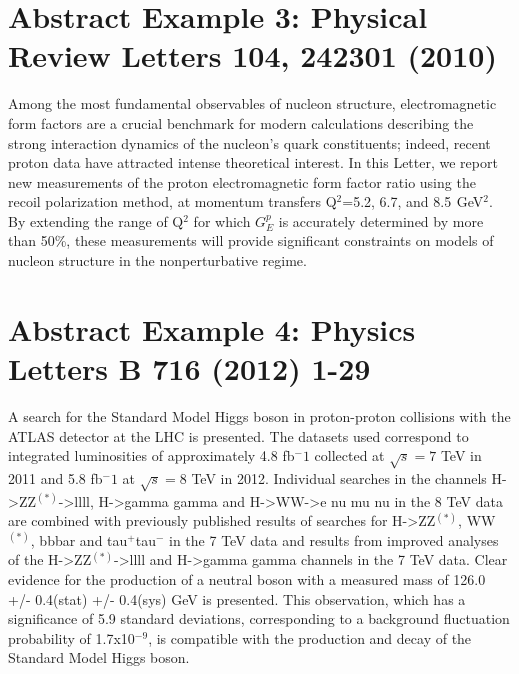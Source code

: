 \documentclass{article}
\begin{document}
\section{Abstract Example 3: Physical Review Letters 104, 242301 (2010)}
Among the most fundamental observables of nucleon structure, electromagnetic form factors are a crucial benchmark for modern calculations describing the strong interaction dynamics of the nucleon's quark constituents; indeed, recent proton data have attracted intense theoretical interest. In this Letter, we report new measurements of the proton electromagnetic form factor ratio using the recoil polarization method, at momentum transfers Q$^2$=5.2, 6.7, and 8.5  GeV$^2$. By extending the range of Q$^2$ for which $G_E^p$ is accurately determined by more than 50\%, these measurements will provide significant constraints on models of nucleon structure in the nonperturbative regime.


\section{Abstract Example 4: Physics Letters B 716 (2012) 1-29}
A search for the Standard Model Higgs boson in proton-proton collisions with the ATLAS detector at the LHC is presented. The datasets used correspond to integrated luminosities of approximately 4.8 fb$^-1$ collected at $\sqrt{s} = 7$ TeV in 2011 and 5.8 fb$^-1$ at $\sqrt{s} = 8$ TeV in 2012. Individual searches in the channels H->ZZ$^(*)$->llll, H->gamma gamma and H->WW->e nu mu nu in the 8 TeV data are combined with previously published results of searches for H->ZZ$^(*)$, WW$^(*)$, bbbar and tau$^+$tau$^-$ in the 7 TeV data and results from improved analyses of the H->ZZ$^(*)$->llll and H->gamma gamma channels in the 7 TeV data. Clear evidence for the production of a neutral boson with a measured mass of 126.0 +/- 0.4(stat) +/- 0.4(sys) GeV is presented. This observation, which has a significance of 5.9 standard deviations, corresponding to a background fluctuation probability of 1.7x10$^{-9}$, is compatible with the production and decay of the Standard Model Higgs boson.
\end{document}
